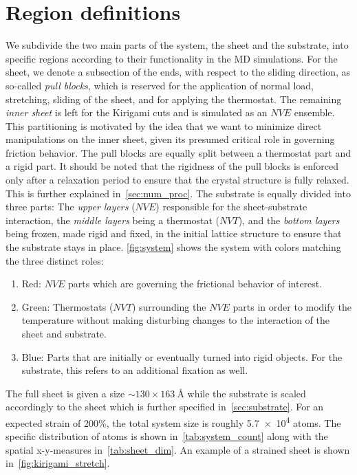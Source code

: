 \section{Region definitions}
We subdivide the two main parts of the system, the sheet and the substrate, into
specific regions according to their functionality in the \acrshort{MD}
simulations. For the sheet, we denote a subsection of the ends, with respect to
the sliding direction, as so-called \textit{pull blocks}, which is reserved for
the application of normal load, stretching, sliding of the sheet, and for
applying the thermostat. The remaining \textit{inner sheet} is left for the
Kirigami cuts and is simulated as an $NVE$ ensemble. This partitioning is motivated by the idea that we want to minimize direct manipulations on the inner sheet, given its presumed critical role in governing friction behavior. The pull blocks are
equally split between a thermostat part and a rigid part. It should be noted that the rigidness of the pull blocks is enforced only after a relaxation period to ensure that the crystal structure is fully relaxed. This is further explained in~\cref{sec:num_proc}. The substrate is equally divided into three parts: The
\textit{upper layers} ($NVE$) responsible for the sheet-substrate interaction,
the \textit{middle layers} being a thermostat ($NVT$), and the \textit{bottom
layers} being frozen, made rigid and fixed, in the initial lattice structure to
ensure that the substrate stays in place. \cref{fig:system} shows the system with colors matching the three distinct roles:
\begin{enumerate}
  \item Red: $NVE$ parts which are governing the frictional behavior of interest.
  \item Green: Thermostats ($NVT$) surrounding the $NVE$ parts in order to modify the temperature without making disturbing changes to the interaction of the sheet and substrate.
  \item Blue: Parts that are initially or eventually turned into rigid objects. For the substrate, this refers to an additional fixation as well.
\end{enumerate}
The full sheet is given a size $\sim 130 \times \SI{163}{\text{Å}}$ while the substrate is scaled accordingly to the sheet which is further specified in~\cref{sec:substrate}. For an expected strain of 200\%, the total system size is roughly \num{5.7e4} atoms. The specific distribution of atoms is shown in~\cref{tab:system_count} along with the spatial x-y-measures in~\cref{tab:sheet_dim}. An example of a strained sheet is shown in~\cref{fig:kirigami_stretch}.


